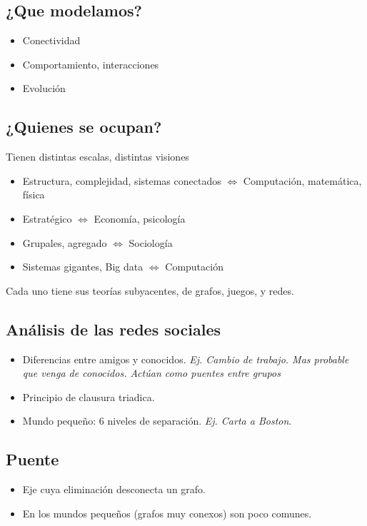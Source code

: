 \documentclass[titlepage,a4paper]{article}
\begin{document}
\subsection{¿Que modelamos?}
\begin{itemize}
    \item Conectividad
    \item Comportamiento, interacciones
    \item Evolución
\end{itemize}

\subsection{¿Quienes se ocupan?}
Tienen distintas escalas, distintas visiones
\begin{itemize}
    \item Estructura, complejidad, sistemas conectados $\Longleftrightarrow$ Computación, matemática, física
    \item Estratégico $\Longleftrightarrow$ Economía, psicología
    \item Grupales, agregado $\Longleftrightarrow$ Sociología
    \item Sistemas gigantes, Big data $\Longleftrightarrow$ Computación
\end{itemize}

Cada uno tiene sus teorías subyacentes, de grafos, juegos, y redes.

\subsection{Análisis de las redes sociales}
\begin{itemize}
    \item Diferencias entre amigos y conocidos. \textit{Ej. Cambio de trabajo. Mas probable que venga de conocidos. Actúan como puentes entre grupos}
    \item Principio de clausura triadica.
    \item Mundo pequeño: 6 niveles de separación. \textit{Ej. Carta a Boston}.
\end{itemize}

\subsection*{Puente}
\begin{itemize}
    \item Eje cuya eliminación desconecta un grafo.
    \item En los mundos pequeños (grafos muy conexos) son poco comunes.
\end{itemize}
\end{document}
